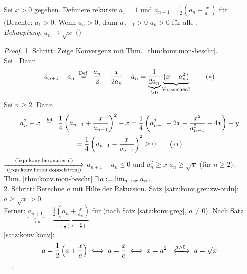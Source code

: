 \documentclass[12pt]{scrreprt}
\begin{document}
\begin{bsp}
\label{bsp:konv.heron}
Sei $x>0$ gegeben. Definiere rekursiv $a_1=1$ und $a_{n+1}=\frac12(a_n+\frac{x}{a_n})$ für . (Beachte: $a_1>0$. Wenn $a_n>0$, dann $a_{n+1}>0$  $a_k>0$ für alle .
\\\emph{Behauptung.} $a_n\to\sqrt{x}$ (\ninf)
\begin{proof}
1. Schritt: Zeige Konvergenz mit Thm.~\ref{thm:konv.mon-beschr}.\\
Sei . Dann
\begin{equation} \label{eqn:konv.heron.stern}
a_{n+1}-a_n \nach{=}{Def.} \frac{a_n}{2} + \frac{x}{2a_n}-a_n = \underbrace{\frac{1}{2a_n}}_{>0} \underbrace{\left(x-a_n^2\right)}_{\text{Vorzeichen?}}
\tag{$*$} \end{equation}
Sei $n\ge2$. Dann
\begin{multline*} \label{eqn:konv.heron.doppelstern}
a_n^2 - x \nach{=}{Def.} \frac14 \left( a_{n-1} + \frac{x}{a_{n-1}} \right)^2 - x = \frac14 \left( a_{n-1}^2 + 2x + \frac{x^2}{a_{n-1}^2} - 4x\right) - y \\= \frac14 \left( a_{n+1} - \frac{x}{a_{n-1}} \right)^2 \ge 0
\tag{$**$} \end{multline*}
$\xLongrightarrow[\text{(\ref{eqn:konv.heron.doppelstern})}]{\text{(\ref{eqn:konv.heron.stern})}}$ $a_{n+1}-a_n \le 0$ und $a_n^2 \ge x$ \folgtnach{\ref{satz:zahlen.potenzen}} $a_n \ge \sqrt{x}$ (für $n\ge2$).\\Thm. \ref{thm:konv.mon-beschr} \folgt $\exists\,a:=\lim_{n\rightarrow\infty}{a_n}$.\\
2. Schritt: Berechne $a$ mit Hilfe der Rekursion. Satz \ref{satz:konv.grenzw-ordn}: $a \ge \sqrt{x} > 0$.\\Ferner: $\underbrace{a_{n+1}}_{\to a}=\underbrace{\frac12\left(a_n+\frac{x}{a_n}\right)}_{\to \frac12\left(a+\frac{x}{a}\right)}$ für \ninf (nach Satz \ref{satz:konv.greg}, $a\ne0$). Nach Satz \ref{satz:konv.konv}:
\[a = \frac12\left(a+\frac{x}{a}\right) \gdw a = \frac{x}{a} \gdw x = a^2 \gdwwegen{a>0} a = \sqrt{x}\]
\end{proof}
\end{bsp}
\end{document}
